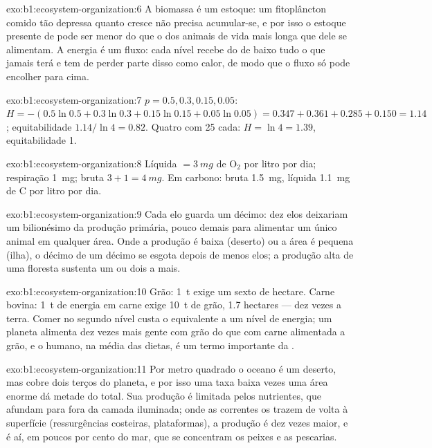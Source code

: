 \begin{solution}{exo:b1:ecosystem-organization:6}
A biomassa é um estoque: um fitoplâncton comido tão depressa quanto
cresce não precisa acumular-se, e por isso o estoque presente de
 pode ser menor do que o dos animais de vida mais longa que
dele se alimentam. A energia é um fluxo: cada nível recebe do de baixo
tudo o que jamais terá e tem de perder parte disso como calor, de modo
que o fluxo só pode encolher para cima.
\end{solution}

\begin{solution}{exo:b1:ecosystem-organization:7}
$p = 0.5, 0.3, 0.15, 0.05$: $H = -(0.5\ln 0.5 + 0.3\ln 0.3 + 0.15\ln
0.15 + 0.05\ln 0.05) = 0.347 + 0.361 + 0.285 + 0.150 = 1.14$;
equitabilidade $1.14/\ln 4 = 0.82$. Quatro com 25 cada: $H = \ln 4 = 1.39$,
equitabilidade 1.
\end{solution}

\begin{solution}{exo:b1:ecosystem-organization:8}
Líquida $= \qty{3}{mg}$ de $\mathrm{O_2}$ por litro por dia;
respiração \qty{1}{mg}; bruta $3 + 1 = \qty{4}{mg}$. Em carbono: bruta
\qty{1.5}{mg}, líquida \qty{1.1}{mg} de C por litro por dia.
\end{solution}

\begin{solution}{exo:b1:ecosystem-organization:9}
Cada elo guarda um décimo: dez elos deixariam um bilionésimo da
produção primária, pouco demais para alimentar um único animal em
qualquer área. Onde a produção é baixa (deserto) ou a área é pequena
(ilha), o décimo de um décimo se esgota depois de menos elos; a
produção alta de uma floresta sustenta um ou dois a mais.
\end{solution}

\begin{solution}{exo:b1:ecosystem-organization:10}
Grão: \qty{1}{t} exige um sexto de hectare. Carne bovina: \qty{1}{t}
de energia em carne exige \qty{10}{t} de grão, \num{1.7} hectares ---
dez vezes a terra. Comer no segundo nível custa o equivalente a um
nível de energia; um planeta alimenta dez vezes mais gente com grão do
que com carne alimentada a grão, e o  humano, na média
das dietas, é um termo importante da .
\end{solution}

\begin{solution}{exo:b1:ecosystem-organization:11}
Por metro quadrado o oceano é um deserto, mas cobre dois terços do
planeta, e por isso uma taxa baixa vezes uma área enorme dá metade do
total. Sua produção é limitada pelos nutrientes, que afundam para fora
da camada iluminada; onde as correntes os trazem de volta à superfície
(ressurgências costeiras, plataformas), a produção é dez vezes maior,
e é aí, em poucos por cento do mar, que se concentram os peixes e as
pescarias.
\end{solution}

